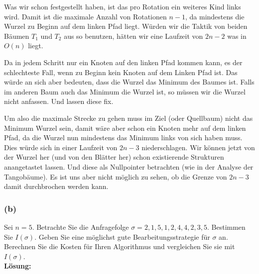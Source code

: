 \documentclass[11pt,a4paper,ngerman]{article}
\begin{document}
Was wir schon festgestellt haben, ist das pro Rotation ein weiteres Kind links wird. Damit ist die maximale Anzahl von Rotationen $n-1$, da mindestens die Wurzel zu Beginn auf dem linken Pfad liegt. Würden wir die Taktik von beiden Bäumen $T_1$ und $T_2$ aus so benutzen, hätten wir eine Laufzeit von $2n-2$ was in $O(n)$ liegt.

Da in jedem Schritt nur ein Knoten auf den linken Pfad kommen kann, es der schlechteste Fall, wenn zu Beginn kein Knoten auf dem Linken Pfad ist. Das würde an sich aber
bedeuten, dass die Wurzel das Minimum des Baumes ist. Falls im anderen Baum auch das Minimum die Wurzel ist, so müssen wir die Wurzel nicht anfassen. Und lassen diese fix.

Um also die maximale Strecke zu gehen muss im Ziel (oder Quellbaum) nicht das Minimum Wurzel sein, damit wäre aber schon ein Knoten mehr auf dem linken Pfad,
da die Wurzel nun mindestens das Minimum links von sich haben muss.\\

Dies würde sich in einer Laufzeit von $2n-3$ niederschlagen. Wir können jetzt von der Wurzel her (und von den Blätter her) schon existierende Strukturen anangetastet lassen. Und diese als Nullpointer betrachten (wie in der Analyse der Tangobäume). Es ist uns aber nicht möglich zu sehen, ob die Grenze von $2n-3$ damit durchbrochen werden kann.

\subsubsection*{(b)}

Sei $n=5$. Betrachte Sie die Anfragefolge $\sigma = 2,1,5,1,2,4,4,2,3,5$. Bestimmen Sie $I(\sigma)$. Geben Sie eine möglichst gute Bearbeitungsstrategie für $\sigma$ an. Berechnen Sie die Kosten für Ihren Algorithmus und vergleichen Sie sie mit $I(\sigma)$.\\

\noindent\textbf{Lösung:}\\

\begin{center}
\end{center}
\end{document}
